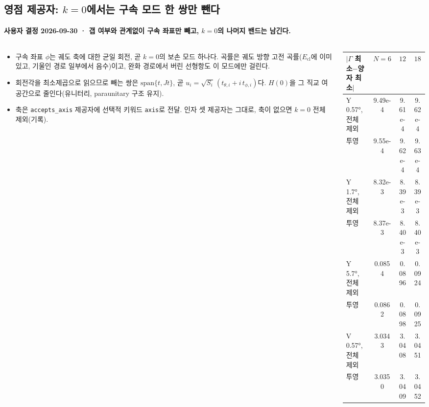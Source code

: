 \subsection{영점 제공자: $k=0$에서는 구속 모드 한 쌍만 뺀다}\label{d28-provider}
\begingroup%
  \framesubtitle{사용자 결정 2026-09-30 · 갭 여부와 관계없이 구속 좌표만 빼고, $k=0$의 나머지 밴드는 남긴다.}
  \footnotesize
  \begin{columns}[T,onlytextwidth]
    \begin{column}{0.46\textwidth}
      \begin{itemize}
        \item 구속 좌표 $\phi$는 궤도 축에 대한 균일 회전, 곧 $k=0$의 보손 모드 하나다. 곡률은 궤도 방향 고전 곡률($E_{\mathrm{cl}}$에 이미 있고, 기울인 경로 일부에서 음수)이고, 완화 경로에서 버린 선형항도 이 모드에만 걸린다.
        \item 회전각을 최소제곱으로 읽으므로 빼는 쌍은 $\mathrm{span}\{t, Jt\}$, 곧 $u_i=\sqrt{S_i}\,(t_{\theta,i}+i\,t_{\phi,i})$다. $H(0)$을 그 직교 여공간으로 줄인다(유니터리, paraunitary 구조 유지).
        \item 축은 \texttt{accepts\_axis} 제공자에 선택적 키워드 \texttt{axis}로 전달. 인자 셋 제공자는 그대로, 축이 없으면 $k=0$ 전체 제외(기록).
      \end{itemize}
    \end{column}
    \begin{column}{0.51\textwidth}
      \renewcommand{\arraystretch}{1.05}
      \begin{tabular}{@{}lccc@{}}
        \toprule
        $|\Gamma$ 최소$-$양자 최소$|$ & $N=6$ & $12$ & $18$ \\
        \midrule
        Y 0.57°, 전체 제외 & 9.49e-4 & 9.61e-4 & 9.62e-4 \\
        \phantom{Y 0.57°,} 투영 & 9.55e-4 & 9.62e-4 & 9.63e-4 \\
        Y 1.7°, 전체 제외 & 8.32e-3 & 8.39e-3 & 8.39e-3 \\
        \phantom{Y 1.7°,} 투영 & 8.37e-3 & 8.40e-3 & 8.40e-3 \\
        Y 5.7°, 전체 제외 & 0.0854 & 0.0896 & 0.0924 \\
        \phantom{Y 5.7°,} 투영 & 0.0862 & 0.0898 & 0.0925 \\
        V 0.57°, 전체 제외 & 3.0343 & 3.0408 & 3.0451 \\
        \phantom{V 0.57°,} 투영 & 3.0350 & 3.0409 & 3.0452 \\
        \bottomrule
      \end{tabular}
    \end{column}
  \end{columns}
